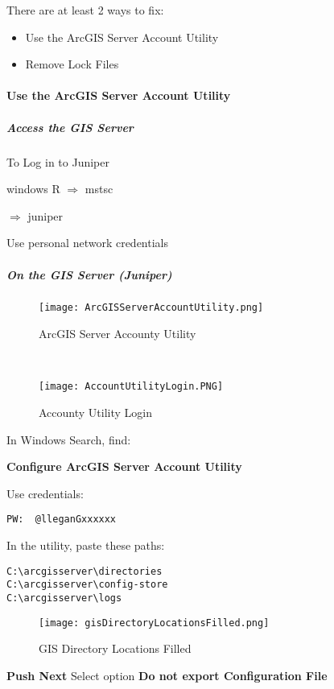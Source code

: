 \documentclass[class=book , crop=false, titlepage, twoside, multi={itemize, figure, verbatim}, float=false]{standalone}
\begin{document}
\noindent There are at least 2 ways to fix:
\begin{itemize}
\item Use the ArcGIS Server Account Utility
\item Remove Lock Files
\end{itemize}
\paragraph[Use the ArcGIS Server Account Utility]{Use the ArcGIS Server Account Utility\texorpdfstring{\\}{}}
\subparagraph*{Access the GIS Server\texorpdfstring{\\}{}}
\noindent To Log in to Juniper
\vspace{.25in}

\noindent windows R $\Rightarrow$ mstsc
\vspace{.25in}

\noindent $\Rightarrow$ juniper
\vspace{.25in}

\noindent Use personal network credentials
\clearpage
\subparagraph*{On the GIS Server (Juniper)\texorpdfstring{\\}{}}
\begin{wrapfigure}{r}{0.5\textwidth}
\centering
\texttt{[image: ArcGISServerAccountUtility.png]}
\caption{ArcGIS Server Accounty Utility}
\vspace{.25in}
\HRule \\[.4cm] %
\vspace{.25in}

\texttt{[image: AccountUtilityLogin.PNG]}
\caption{Accounty Utility Login}
\end{wrapfigure}
\vspace{.5in}

In Windows Search, find:
\vspace{.35in}

\noindent \textbf{Configure ArcGIS Server Account Utility}
\vspace{3in}

\noindent Use credentials:
\vspace{.35in}

\begin{verbatim}
PW:  @lleganGxxxxxx
\end{verbatim}
\clearpage
\noindent In the utility, paste these paths:
\begin{verbatim}
C:\arcgisserver\directories
C:\arcgisserver\config-store
C:\arcgisserver\logs
\end{verbatim}
\begin{figure}[h!]
\centering
\texttt{[image: gisDirectoryLocationsFilled.png]}
\caption{GIS Directory Locations Filled}
\end{figure}
\noindent\textbf{\Large Push Next}
\clearpage
\noindent Select option \textbf{Do not export Configuration File}
\end{document}
